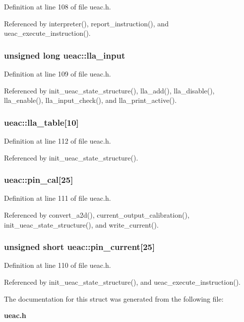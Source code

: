 Definition at line 108 of file ueac.h.

Referenced by interpreter(), report\_\-instruction(), and ueac\_\-execute\_\-instruction().
\subsubsection{\setlength{\rightskip}{0pt plus 5cm}unsigned long {\bf ueac::lla\_\-input}}\label{structueac_o1}




Definition at line 109 of file ueac.h.

Referenced by init\_\-ueac\_\-state\_\-structure(), lla\_\-add(), lla\_\-disable(), lla\_\-enable(), lla\_\-input\_\-check(), and lla\_\-print\_\-active().
\subsubsection{ {\bf ueac::lla\_\-table}[10]}\label{structueac_o4}




Definition at line 112 of file ueac.h.

Referenced by init\_\-ueac\_\-state\_\-structure().
\subsubsection{ {\bf ueac::pin\_\-cal}[25]}\label{structueac_o3}




Definition at line 111 of file ueac.h.

Referenced by convert\_\-a2d(), current\_\-output\_\-calibration(), init\_\-ueac\_\-state\_\-structure(), and write\_\-current().
\subsubsection{\setlength{\rightskip}{0pt plus 5cm}unsigned short {\bf ueac::pin\_\-current}[25]}\label{structueac_o2}




Definition at line 110 of file ueac.h.

Referenced by init\_\-ueac\_\-state\_\-structure(), and ueac\_\-execute\_\-instruction().

The documentation for this struct was generated from the following file:\begin{CompactItemize}
\item 
{\bf ueac.h}\end{CompactItemize}
